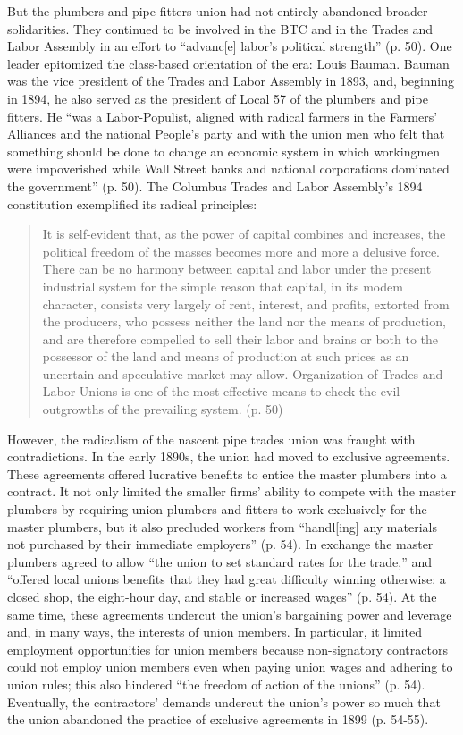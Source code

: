 But the plumbers and pipe fitters union had not entirely abandoned broader solidarities. They continued to be involved in the BTC and in the Trades and Labor Assembly in an effort to “advanc[e] labor’s political strength” (p. 50). One leader epitomized the class-based orientation of the era: Louis Bauman. Bauman was the vice president of the Trades and Labor Assembly in 1893, and, beginning in 1894, he also served as the president of Local 57 of the plumbers and pipe fitters. He “was a Labor-Populist, aligned with radical farmers in the Farmers’ Alliances and the national People’s party and with the union men who felt that something should be done to change an economic system in which workingmen were impoverished while Wall Street banks and national corporations dominated the government” (p. 50). The Columbus Trades and Labor Assembly’s 1894 constitution exemplified its radical principles:

\begin{quote}
	It is self-evident that, as the power of capital combines and increases, the political freedom of the masses becomes more and more a delusive force. There can be no harmony between capital and labor under the present industrial system for the simple reason that capital, in its modem character, consists very largely of rent, interest, and profits, extorted from the producers, who possess neither the land nor the means of production, and are therefore compelled to sell their labor and brains or both to the possessor of the land and means of production at such prices as an uncertain and speculative market may allow. Organization of Trades and Labor Unions is one of the most effective means to check the evil outgrowths of the prevailing system. (p. 50)
\end{quote}

However, the radicalism of the nascent pipe trades union was fraught with contradictions. In the early 1890s, the union had moved to exclusive agreements. These agreements offered lucrative benefits to entice the master plumbers into a contract. It not only limited the smaller firms’ ability to compete with the master plumbers by requiring union plumbers and fitters to work exclusively for the master plumbers, but it also precluded workers from “handl[ing] any materials not purchased by their immediate employers” (p. 54). In exchange the master plumbers agreed to allow “the union to set standard rates for the trade,” and “offered local unions benefits that they had great difficulty winning otherwise: a closed shop, the eight-hour day, and stable or increased wages” (p. 54). At the same time, these agreements undercut the union’s bargaining power and leverage and, in many ways, the interests of union members. In particular, it limited employment opportunities for union members because non-signatory contractors could not employ union members even when paying union wages and adhering to union rules; this also hindered “the freedom of action of the unions” (p. 54). Eventually, the contractors’ demands undercut the union’s power so much that the union abandoned the practice of exclusive agreements in 1899 (p. 54-55).

